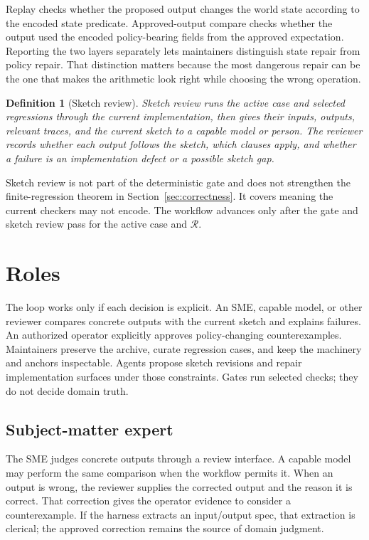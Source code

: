 \documentclass[11pt]{article}
\newtheorem{definition}{Definition}
\newcommand{\regression}{\mathcal{R}}
\begin{document}
Replay checks whether the proposed output changes the world state according to the encoded
state predicate.  Approved-output compare checks whether the output used the encoded policy-bearing
fields from the approved expectation.  Reporting the two layers separately lets maintainers
distinguish state repair from policy repair.  That distinction matters because the most
dangerous repair can be the one that makes the arithmetic look right while choosing the wrong
operation.

\begin{definition}[Sketch review]
Sketch review runs the active case and selected regressions through the current implementation,
then gives their inputs, outputs, relevant traces, and the current sketch to a capable model or
person.  The reviewer records whether each output follows the sketch, which clauses apply, and
whether a failure is an implementation defect or a possible sketch gap.
\end{definition}

Sketch review is not part of the deterministic gate and does not strengthen the
finite-regression theorem in Section~\ref{sec:correctness}.  It covers meaning the current
checkers may not encode.  The workflow advances only after the gate and sketch review pass for
the active case and $\regression$.

\section{Roles}
\label{sec:roles}

The loop works only if each decision is explicit.  An SME, capable model, or other reviewer
compares concrete outputs with the current sketch and explains failures.  An authorized operator
explicitly approves policy-changing counterexamples.
Maintainers preserve the archive, curate regression cases, and keep the machinery and anchors
inspectable.  Agents propose sketch revisions and repair implementation surfaces under those
constraints.  Gates run selected checks; they do not decide domain truth.

\subsection{Subject-matter expert}

The SME judges concrete outputs through a review interface.  A capable model may perform the same
comparison when the workflow permits it.  When an output is wrong, the reviewer supplies the
corrected output and the reason it is correct.  That correction gives the operator evidence to
consider a counterexample.  If the harness extracts an input/output spec, that extraction is
clerical; the approved correction remains the source of domain judgment.
\end{document}
